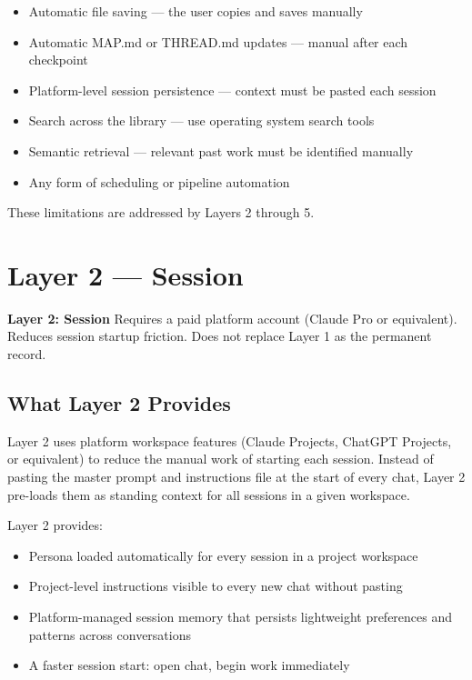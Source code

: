 \documentclass[12pt,letterpaper]{article}
\begin{document}
\begin{itemize}
  \item Automatic file saving --- the user copies and saves manually
  \item Automatic MAP.md or THREAD.md updates --- manual after each checkpoint
  \item Platform-level session persistence --- context must be pasted each session
  \item Search across the library --- use operating system search tools
  \item Semantic retrieval --- relevant past work must be identified manually
  \item Any form of scheduling or pipeline automation
\end{itemize}

These limitations are addressed by Layers 2 through 5.

\section{Layer 2 --- Session}

\begin{layerbox2}
\textbf{Layer 2: Session} \quad Requires a paid platform account (Claude Pro or equivalent).\\
Reduces session startup friction. Does not replace Layer 1 as the permanent record.
\end{layerbox2}

\subsection{What Layer 2 Provides}

Layer 2 uses platform workspace features (Claude Projects, ChatGPT Projects,
or equivalent) to reduce the manual work of starting each session.
Instead of pasting the master prompt and instructions file at the start
of every chat, Layer 2 pre-loads them as standing context for all sessions
in a given workspace.

Layer 2 provides:

\begin{itemize}
  \item Persona loaded automatically for every session in a project workspace
  \item Project-level instructions visible to every new chat without pasting
  \item Platform-managed session memory that persists lightweight preferences
        and patterns across conversations
  \item A faster session start: open chat, begin work immediately
\end{itemize}
\end{document}
